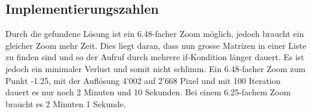 \subsection{Implementierungszahlen}
Durch die gefundene Lösung ist ein 6.48-facher Zoom möglich, jedoch braucht ein gleicher Zoom mehr Zeit. Dies liegt daran, dass nun grosse Matrizen in einer Liste zu finden sind und so der Aufruf durch mehrere if-Kondition länger dauert. Es ist jedoch ein minimaler Verlust und somit nicht schlimm. Ein 6.48-facher Zoom zum Punkt -1.25, mit der Auflösung 4'002 auf 2'668 Pixel und mit 100 Iteration dauert es nur noch 2 Minuten und 10 Sekunden. Bei einem 6.25-fachem Zoom braucht es 2 Minuten 1 Sekunde.
